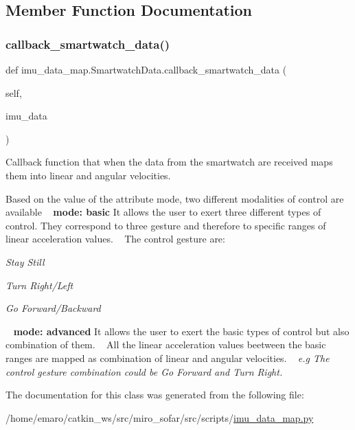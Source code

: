 \subsection{Member Function Documentation}
\mbox{\label{classimu__data__map_1_1SmartwatchData_ad7bedaa8d67da50b9db0b9d0984816d0}} 
\subsubsection{\texorpdfstring{callback\+\_\+smartwatch\+\_\+data()}{callback\_smartwatch\_data()}}
{\footnotesize\ttfamily def imu\+\_\+data\+\_\+map.\+Smartwatch\+Data.\+callback\+\_\+smartwatch\+\_\+data (\begin{DoxyParamCaption}\item[{}]{self,  }\item[{}]{imu\+\_\+data }\end{DoxyParamCaption})}



Callback function that when the data from the smartwatch are received maps them into linear and angular velocities. 

Based on the value of the attribute mode, two different modalities of control are available ~\newline
 {\bfseries{mode\+: basic}}  It allows the user to exert three different types of control. They correspond to three gesture and therefore to specific ranges of linear acceleration values. ~\newline
 The control gesture are\+: 
\begin{DoxyItemize}
\item {\itshape Stay Still} 
\item {\itshape Turn Right/\+Left} 
\item {\itshape Go Forward/\+Backward}
\end{DoxyItemize} ~\newline
 {\bfseries{mode\+: advanced}}  It allows the user to exert the basic types of control but also combination of them. ~\newline
 All the linear acceleration values beetween the basic ranges are mapped as combination of linear and angular velocities. ~\newline
{\itshape  e.\+g The control gesture combination could be Go Forward and Turn Right.}  

The documentation for this class was generated from the following file\+:\begin{DoxyCompactItemize}
\item 
/home/emaro/catkin\+\_\+ws/src/miro\+\_\+sofar/src/scripts/\mbox{\hyperlink{imu__data__map_8py}{imu\+\_\+data\+\_\+map.\+py}}\end{DoxyCompactItemize}
